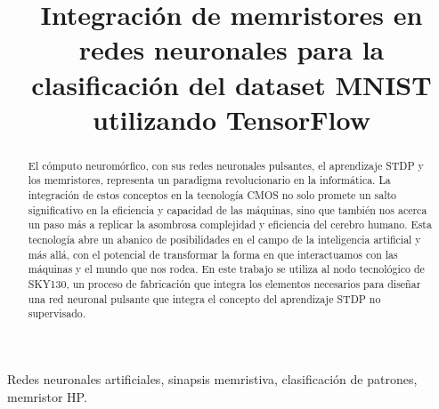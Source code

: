 \documentclass[conference]{IEEEtran}
\begin{document}
\title{Integración de memristores en redes neuronales para la clasificación del dataset MNIST utilizando TensorFlow\\
}

\author{
\and
{}
}
\maketitle

\begin{abstract}
El cómputo neuromórfico, con sus redes neuronales pulsantes, el aprendizaje STDP y los memristores, representa un paradigma revolucionario en la informática. La integración de estos conceptos en la tecnología CMOS no solo promete un salto significativo en la eficiencia y capacidad de las máquinas, sino que también nos acerca un paso más a replicar la asombrosa complejidad y eficiencia del cerebro humano. Esta tecnología abre un abanico de posibilidades en el campo de la inteligencia artificial y más allá, con el potencial de transformar la forma en que interactuamos con las máquinas y el mundo que nos rodea. En este trabajo se utiliza al nodo tecnológico de SKY130, un proceso de fabricación que integra los elementos necesarios para diseñar una red neuronal pulsante que integra el concepto del aprendizaje STDP no supervisado.
\end{abstract}

\begin{IEEEkeywords}
Redes neuronales artificiales, sinapsis memristiva, clasificación de patrones, memristor HP.
\end{IEEEkeywords}
\end{document}
